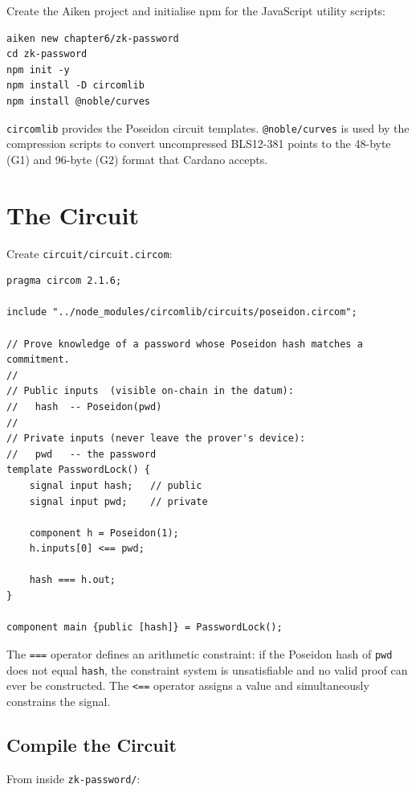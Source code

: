 Create the Aiken project and initialise npm for the JavaScript utility scripts:

\begin{verbatim}
aiken new chapter6/zk-password
cd zk-password
npm init -y
npm install -D circomlib
npm install @noble/curves
\end{verbatim}

\texttt{circomlib} provides the Poseidon circuit templates.
\texttt{@noble/curves} is used by the compression scripts to convert uncompressed
BLS12-381 points to the 48-byte (G1) and 96-byte (G2) format that Cardano accepts.

\section{The Circuit} \label{sec:ch6-circuit}

Create \texttt{circuit/circuit.circom}:

\begin{verbatim}
pragma circom 2.1.6;

include "../node_modules/circomlib/circuits/poseidon.circom";

// Prove knowledge of a password whose Poseidon hash matches a commitment.
//
// Public inputs  (visible on-chain in the datum):
//   hash  -- Poseidon(pwd)
//
// Private inputs (never leave the prover's device):
//   pwd   -- the password
template PasswordLock() {
    signal input hash;   // public
    signal input pwd;    // private

    component h = Poseidon(1);
    h.inputs[0] <== pwd;

    hash === h.out;
}

component main {public [hash]} = PasswordLock();
\end{verbatim}

The \texttt{===} operator defines an arithmetic constraint: if the Poseidon hash
of \texttt{pwd} does not equal \texttt{hash}, the constraint system is
unsatisfiable and no valid proof can ever be constructed.
The \texttt{<==} operator assigns a value and simultaneously constrains the signal.

\subsection*{Compile the Circuit}

From inside \texttt{zk-password/}:

